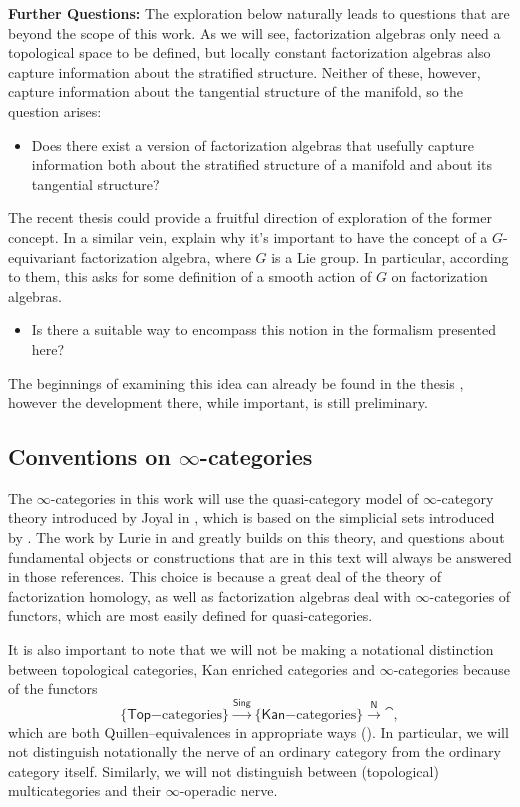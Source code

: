 \documentclass[../text]{subfiles}
\begin{document}
\textbf{Further Questions:} The exploration below naturally leads to questions that are beyond the scope of this work. As we will see, factorization algebras only need a topological space to be defined, but locally constant factorization algebras also capture information about the stratified structure. Neither of these, however, capture information about the tangential structure of the manifold, so the question arises:
%
\begin{itemize}
    \item Does there exist a version of factorization algebras that usefully capture information both about the stratified structure of a manifold and about its tangential structure?
\end{itemize}
%
The recent thesis \cite{pena2022} could provide a fruitful direction of exploration of the former concept. In a similar vein, \cite{cg2016} explain why it's important to have the concept of a $G$-equivariant factorization algebra, where $G$ is a Lie group. In particular, according to them, this asks for some definition of a smooth action of $G$ on factorization algebras.
%
\begin{itemize}
    \item Is there a suitable way to encompass this notion in the formalism presented here?
\end{itemize}
%
The beginnings of examining this idea can already be found in the thesis \cite{murray2020}, however the development there, while important, is still preliminary.



\subsection{Conventions on \texorpdfstring{$\infty$}{infinity}-categories}

The $\infty$-categories in this work will use the quasi-category model of $\infty$-category theory introduced by Joyal in \cite{joyal}, which is based on the simplicial sets introduced by \cite{bv73}. The work by Lurie in \cite{lurie_htt} and \cite{lurie_ha} greatly builds on this theory, and questions about fundamental objects or constructions that are in this text will always be answered in those references. This choice is because a great deal of the theory of factorization homology, as well as factorization algebras deal with $\infty$-categories of functors, which are most easily defined for quasi-categories.

It is also important to note that we will not be making a notational distinction between topological categories, Kan enriched categories and $\infty$-categories because of the functors
%
\begin{equation}
    \{ \mathsf{Top}\mathrm{-categories}\} \xrightarrow{\mathsf{Sing}} \{ \mathsf{Kan}\mathrm{-categories}\} \xrightarrow{\mathsf{N}} \cat,
\end{equation}
%
which are both Quillen--equivalences in appropriate ways (\cite{joyal2007quasi,bergner2010survey}). In particular, we will not distinguish notationally the nerve of an ordinary category from the ordinary category itself. Similarly, we will not distinguish between (topological) multicategories and their $\infty$-operadic nerve.
\end{document}
